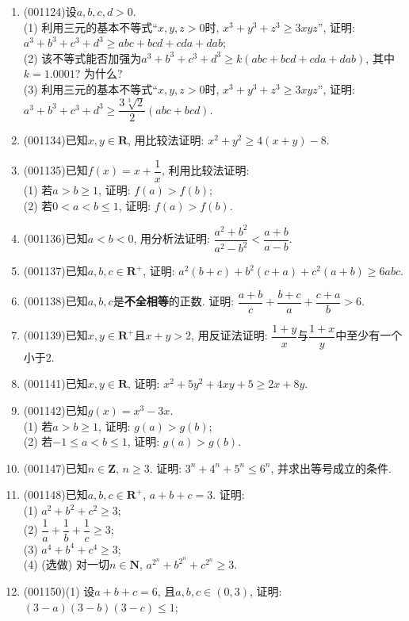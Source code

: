 \documentclass[10pt,a4paper]{article}
\begin{document}
\begin{enumerate}[1.]
\item {\tiny (001124)}设$a,b,c,d>0$.\\ 
(1) 利用三元的基本不等式``$x,y,z>0$时, $x^3+y^3+z^3\ge 3xyz$'', 证明: $a^3+b^3+c^3+d^3\geq abc+bcd+cda+dab$;\\ 
(2) 该不等式能否加强为$a^3+b^3+c^3+d^3\ge k(abc+bcd+cda+dab)$, 其中$k=1.0001$? 为什么?\\ 
(3) 利用三元的基本不等式``$x,y,z>0$时, $x^3+y^3+z^3\ge 3xyz$'', 证明: $a^3+b^3+c^3+d^3\geq \dfrac{3\sqrt[3]{2}}{2}(abc+bcd)$.
\item {\tiny (001134)}已知$x,y \in \mathbf{R}$, 用比较法证明: $x^2+y^2\ge 4(x+y)-8$.
\item {\tiny (001135)}已知$f(x)=x+\dfrac{1}{x}$, 利用比较法证明:\\ 
(1) 若$a>b\ge 1$, 证明: $f(a)>f(b)$;\\ 
(2) 若$0<a<b\le 1$, 证明: $f(a)>f(b)$.
\item {\tiny (001136)}已知$a<b<0$, 用分析法证明: $\dfrac{a^2+b^2}{a^2-b^2}<\dfrac{a+b}{a-b}$.
\item {\tiny (001137)}已知$a,b,c\in \mathbf{R}^+$, 证明: $a^2(b+c)+b^2(c+a)+c^2(a+b)\ge 6abc$.
\item {\tiny (001138)}已知$a,b,c$是{\bf 不全相等}的正数. 证明: $\dfrac{a+b}{c}+\dfrac{b+c}{a}+\dfrac{c+a}{b}>6$.
\item {\tiny (001139)}已知$x,y\in \mathbf{R}^+$且$x+y>2$, 用反证法证明: $\dfrac{1+y}{x}$与$\dfrac{1+x}{y}$中至少有一个小于$2$.
\item {\tiny (001141)}已知$x,y\in \mathbf{R}$, 证明: $x^2+5y^2+4xy+5\ge 2x+8y$.
\item {\tiny (001142)}已知$g(x)=x^3-3x$.\\ 
(1) 若$a>b\ge 1$, 证明: $g(a)>g(b)$;\\ 
(2) 若$-1\le a<b\le 1$, 证明: $g(a)>g(b)$.
\item {\tiny (001147)}已知$n\in\mathbf{Z}$, $n \ge 3$. 证明: $3^n+4^n+5^n\le 6^n$, 并求出等号成立的条件.
\item {\tiny (001148)}已知$a,b,c\in \mathbf{R}^+$, $a+b+c=3$. 证明:\\ 
(1) $a^2+b^2+c^2\ge 3$;\\ 
(2) $\dfrac1a+\dfrac1b+\dfrac1c\ge 3$;\\ 
(3) $a^4+b^4+c^4\ge 3$;\\ 
(4) (选做) 对一切$n\in \mathbf{N}$, $a^{2^n}+b^{2^n}+c^{2^n}\ge 3$.
\item {\tiny (001150)}(1) 设$a+b+c=6$, 且$a,b,c\in(0,3)$, 证明: $(3-a)(3-b)(3-c)\le 1$;\\ 

\end{enumerate}
\end{document}
